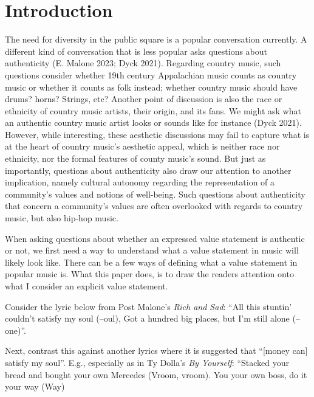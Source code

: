 \documentclass[12pt]{book}
\theoremstyle{definition}
\theoremstyle{remark}
\begin{document}
\section{Introduction}\label{introduction}

The need for diversity in the public square is a popular conversation currently. A different kind of conversation that is less popular asks questions about authenticity (E. Malone 2023; Dyck 2021). Regarding country music, such questions consider whether 19th century Appalachian music counts as country music or whether it counts as folk instead; whether country music should have drums? horns? Strings, etc? Another point of discussion is also the race or ethnicity of country music artists, their origin, and its fans. We might ask what an authentic country music artist looks or sounds like for instance (Dyck 2021). However, while interesting, these aesthetic discussions may fail to capture what is at the heart of country music's aesthetic appeal, which is neither race nor ethnicity, nor the formal features of county music's sound. But just as importantly, questions about authenticity also draw our attention to another implication, namely cultural autonomy regarding the representation of a community's values and notions of well-being. Such questions about authenticity that concern a community's values are often overlooked with regards to country music, but also hip-hop music.

When asking questions about whether an expressed value statement is authentic or not, we first need a way to understand what a value statement in music will likely look like. There can be a few ways of defining what a value statement in popular music is. What this paper does, is to draw the readers attention onto what I consider an explicit value statement.

Consider the lyric below from Post Malone's \emph{Rich and Sad}: ``All this stuntin' couldn't satisfy my soul (--oul), Got a hundred big places, but I'm still alone (--one)''.

Next, contrast this against another lyrics where it is suggested that ``{[}money can{]} satisfy my soul''. E.g., especially as in Ty Dolla's \emph{By Yourself}: ``Stacked your bread and bought your own Mercedes (Vroom, vroom). You your own boss, do it your way (Way)
\end{document}
